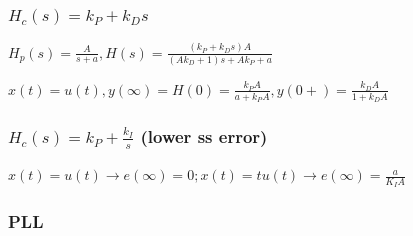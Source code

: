 \subsubsection*{$H_c(s) = k_P+k_Ds$}

$H_p(s)=\frac{A}{s+a}, H(s)=\frac{(k_P+k_Ds)A}{(Ak_D+1)s+Ak_P+a}$

$x(t)=u(t), y(\infty)=H(0)=\frac{k_PA}{a+k_PA}, y(0+)=\frac{k_DA}{1+k_DA}$

\subsubsection*{$H_c(s) = k_P+\frac{k_I}{s}$ (lower ss error)}

$x(t)=u(t)\rightarrow e(\infty)=0; x(t) = tu(t)\rightarrow e(\infty) = \frac{a}{K_IA}$

\subsubsection*{PLL}


